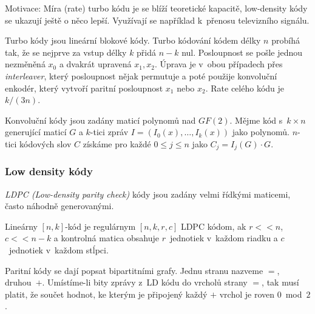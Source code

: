 
Motivace: Míra (rate) turbo kódu je se blíží teoretické kapacitě,
low-density kódy se ukazují ještě o něco lepší. Využívají se například
k~přenosu televizního signálu.

Turbo kódy jsou lineární blokové kódy.
Turbo kódování kódem délky $n$ probíhá tak, že se nejprve za vstup délky $k$ přidá $n -
k$ nul. Posloupnost se pošle jednou nezměněná $x_0$ a dvakrát upravená
$x_1, x_2$. Úprava
je v~obou případech přes {\em interleaver}, který posloupnost nějak
permutuje a poté použije konvoluční enkodér, který vytvoří paritní
posloupnost $x_1$ nebo $x_2$. Rate celého kódu je $k/(3n)$.

Konvoluční kódy jsou zadány maticí polynomů nad $GF(2)$. Mějme kód
s~$k\times n$ generující maticí $G$ a $k$-tici zpráv
$I = (I_0(x),\ldots,I_k(x))$ jako polynomů. $n$-tici kódových slov
$C$ získáme pro každé $0 \leq j \leq n$ jako $C_j = I_j(G) \cdot G$.

\subsubsection{Low density kódy}


{\em LDPC (Low-density parity check)} kódy jsou zadány velmi řídkými maticemi, často náhodně
generovanými. 

Lineárny $[n,k]$-kód je regulárnym $[n,k,r,c]$ LDPC kódom, ak $r << n$,
$c << n-k$ a kontrolná matica obsahuje $r$~jednotiek v~každom riadku
a $c$~jednotiek v~každom stĺpci.

Paritní kódy se dají popsat bipartitními grafy.
Jednu stranu nazveme $=$, druhou~$+$. Umístíme-li bity zprávy z~LD kódu
do vrcholů strany $=$, tak musí platit, že součet hodnot, ke kterým je
připojený každý $+$ vrchol je roven $0$~mod~$2$.

